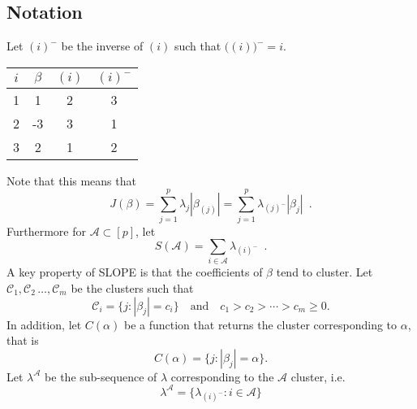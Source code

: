 \subsection{Notation}\label{sec:notation}

Let \((i)^{-}\) be the inverse of \((i)\) such that
\(\big((i)\big)^- = i\).
\begin{example}
  \begin{tabular}{cccc}
    \toprule
    \(i\) & \(\beta\) & \((i)\) & \((i)^-\) \\
    \midrule
    1     & 1         & 2       & 3         \\
    2     & -3        & 3       & 1         \\
    3     & 2         & 1       & 2         \\
    \bottomrule
  \end{tabular}
\end{example}
Note that this means that
\[
  J(\beta) = \sum_{j=1}^p \lambda_j |\beta_{(j)}|
           = \sum_{j=1}^p \lambda_{(j)^-}|\beta_j| \enspace.
\]
%
Furthermore for $\mathcal{A} \subset [p]$, let
\[
  S(\mathcal{A}) = \sum_{i \in \mathcal{A}} \lambda_{(i)^-} \enspace.
\]
%
A key property of SLOPE is that the coefficients of $\beta$ tend to cluster.
Let \(\mathcal{C}_1, \mathcal{C}_2\, \dots, \mathcal{C}_m\) be the
clusters such that
\[
  \mathcal{C}_i = \{j : |\beta_j| = c_i\} \quad \text{and} \quad
  c_1 > c_2 > \cdots > c_m \geq 0.
\]
In addition, let \(C(\alpha)\) be a function that returns the
cluster corresponding to \(\alpha\), that is
\[
  C(\alpha) = \{j : |\beta_j| = \alpha\}.
\]
Let \(\lambda^{\mathcal{A}}\) be the sub-sequence of
\(\lambda\) corresponding to the \(\mathcal{A}\) cluster, i.e.
\[
  \lambda^\mathcal{A} = \{\lambda_{(i)^-} : i \in \mathcal{A}\}
\]




